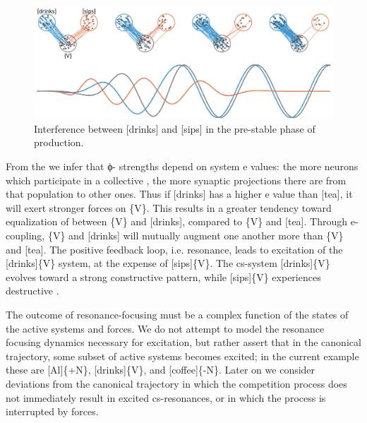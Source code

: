   
\begin{figure}
\includegraphics[width=\textwidth]{figures/Tilsen-img52.png}
\caption{Interference between [drinks] and [sips] in the pre-stable phase of production.}
\label{fig:4:2}
\end{figure}
 

From the  we infer that ϕ{}- strengths depend on system e values: the more neurons which participate in a collective , the more synaptic projections there are from that population to other ones. Thus if [drinks] has a higher e value than [tea], it will exert stronger forces on \{V\}. This results in a greater tendency toward equalization of  between \{V\} and [drinks], compared to \{V\} and [tea]. Through e-coupling, \{V\} and [drinks] will mutually augment one another more than \{V\} and [tea]. The positive feedback loop, i.e. resonance, leads to excitation of the [drinks]\{V\} system, at the expense of [sips]\{V\}. The cs-system [drinks]\{V\} evolves toward a strong constructive  pattern, while [sips]\{V\} experiences destructive .

The outcome of resonance-focusing must be a complex function of the states of the active systems and  forces. We do not attempt to model the resonance focusing dynamics necessary for excitation, but rather assert that in the canonical trajectory, some subset of active systems becomes excited; in the current example these are [Al]\{+N\}, [drinks]\{V\}, and [coffee]\{-N\}. Later on we consider deviations from the canonical trajectory in which the competition process does not immediately result in excited cs-resonances, or in which the process is interrupted by  forces.

